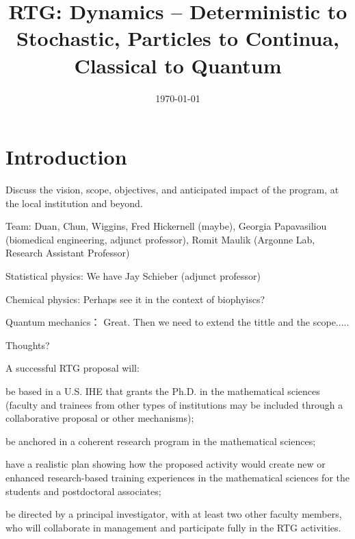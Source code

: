 \documentclass[11pt]{article}
\begin{document}
  
\title{RTG: Dynamics -- Deterministic to Stochastic, Particles to Continua, Classical to Quantum }
\author{    }

\date{\today}
 
\maketitle

\tableofcontents


\section{Introduction}
Discuss the vision, scope, objectives, and anticipated impact of the program, at the local institution and beyond.



Team: 
Duan, Chun,  Wiggins,    Fred Hickernell (maybe), Georgia Papavasiliou (biomedical engineering, adjunct professor),
Romit Maulik (Argonne Lab, Research Assistant Professor)
 
Statistical physics: We have Jay Schieber (adjunct professor) 

Chemical physics: Perhaps see it in the context of biophyiscs?

Quantum mechanics： Great. Then we need to extend  the tittle and the scope.....

Thoughts?





A successful RTG proposal will:

be based in a U.S. IHE that grants the Ph.D. in the mathematical sciences (faculty and trainees from other types of institutions may be included through a collaborative proposal or other mechanisms);

be anchored in a coherent research program in the mathematical sciences;

have a realistic plan showing how the proposed activity would create new or enhanced research-based training experiences in the mathematical sciences for the students and postdoctoral associates;

be directed by a principal investigator, with at least two other faculty members, who will collaborate in management and participate fully in the RTG activities.
\end{document}
